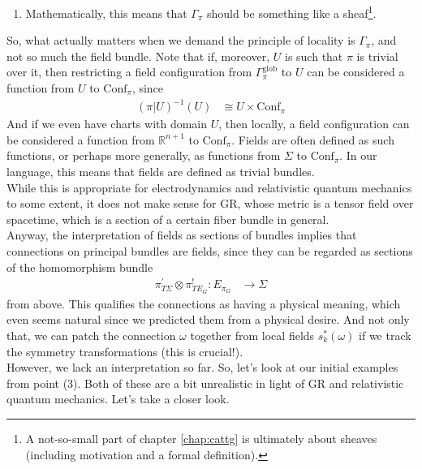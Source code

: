 \begin{enumerate}
\begin{enumerate}
\item[$\pmb{\hookrightarrow}$]
Mathematically, this means that $\Gamma_{\pi}$ should be something like a sheaf\footnote{A not-so-small part of chapter \ref{chap:cattg} is ultimately about sheaves (including motivation and a formal definition).}.
\end{enumerate}
So, what actually matters when we demand the principle of locality is $\Gamma_{\pi}$, and not so much the field bundle.
Note that if, moreover, $U$ is such that $\pi$ is trivial over it, then restricting a field configuration from $\Gamma_{\pi}^{\mathrm{glob}}$ to $U$ can be considered a function from $U$ to $\mathrm{Conf}_{\pi}$, since
\begin{align*}
  (\pi \vert U)^{-1}(U)
  &\cong
  U
  \times
  \mathrm{Conf}_{\pi}
\end{align*}
And if we even have charts with domain $U$, then locally, a field configuration can be considered a function from $\mathbb{R}^{n+1}$ to $\mathrm{Conf}_{\pi}$.
Fields are often defined as such functions, or perhaps more generally, as functions from $\Sigma$ to $\mathrm{Conf}_{\pi}$.
In our language, this means that fields are defined as trivial bundles.
\\
While this is appropriate for electrodynamics and relativistic quantum mechanics to some extent, it does not make sense for GR, whose metric is a tensor field over spacetime, which is a section of a certain fiber bundle in general.
\\
Anyway, the interpretation of fields as sections of bundles implies that connections on principal bundles are fields, since they can be regarded as sections of the homomorphism bundle
\begin{align*}
  \pi_{T\Sigma}^{\prime}
  \otimes
  \pi_{TE_{G}}^{!}
  \colon
  E_{\pi_{G}}
  &\rightarrow
  \Sigma
\end{align*}
from above.
This qualifies the connections as having a physical meaning, which even seems natural since we predicted them from a physical desire.
And not only that, we can patch the connection $\omega$ together from local fields $s_{k}^{\ast}(\omega)$ if we track the symmetry transformations (this is crucial!).
\\
However, we lack an interpretation so far.
So, let's look at our initial examples from point (3).
Both of these are a bit unrealistic in light of GR and relativistic quantum mechanics.
Let's take a closer look.
\begin{enumerate}

\end{enumerate}
\end{enumerate}
